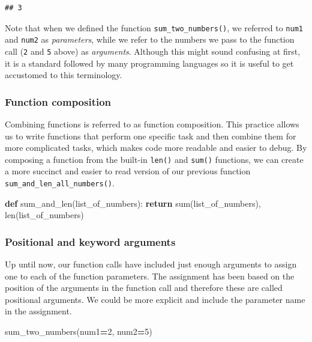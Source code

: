 \documentclass[]{Nemilov}
\newenvironment{Shaded}{\begin{snugshade}}{\end{snugshade}}
\newcommand{\BuiltInTok}[1]{#1}
\newcommand{\ControlFlowTok}[1]{\textcolor[rgb]{0.13,0.29,0.53}{\textbf{#1}}}
\newcommand{\DecValTok}[1]{\textcolor[rgb]{0.00,0.00,0.81}{#1}}
\newcommand{\KeywordTok}[1]{\textcolor[rgb]{0.13,0.29,0.53}{\textbf{#1}}}
\newcommand{\NormalTok}[1]{#1}
\newcommand{\OperatorTok}[1]{\textcolor[rgb]{0.81,0.36,0.00}{\textbf{#1}}}
\begin{document}
\begin{verbatim}
## 3
\end{verbatim}

Note that when we defined the function \texttt{sum\_two\_numbers()}, we referred to
\texttt{num1} and \texttt{num2} as \emph{parameters}, while we refer to the numbers we pass to the
function call (\texttt{2} and \texttt{5} above) as \emph{arguments}. Although this might sound
confusing at first, it is a standard followed by many programming languages so
it is useful to get accustomed to this terminology.

\hypertarget{py-dev-function-composition}{%
\subsubsection{Function composition}\label{py-dev-function-composition}}

Combining functions is referred to as function composition. This practice
allows us to write functions that perform one specific task and then combine
them for more complicated tasks, which makes code more readable and easier to
debug. By composing a function from the built-in \texttt{len()} and \texttt{sum()} functions,
we can create a more succinct and easier to read version of our previous
function \texttt{sum\_and\_len\_all\_numbers()}.

\begin{Shaded}
\begin{Highlighting}[]
\KeywordTok{def}\NormalTok{ sum_and_len(list_of_numbers):}
    \ControlFlowTok{return} \BuiltInTok{sum}\NormalTok{(list_of_numbers), }\BuiltInTok{len}\NormalTok{(list_of_numbers)}
\end{Highlighting}
\end{Shaded}

\hypertarget{py-dev-positional-and-keyword-arguments}{%
\subsubsection{Positional and keyword arguments}\label{py-dev-positional-and-keyword-arguments}}

Up until now, our function calls have included just enough arguments to assign
one to each of the function parameters. The assignment has been based on the
position of the arguments in the function call and therefore these are called
positional arguments. We could be more explicit and include the parameter name
in the assignment.

\begin{Shaded}
\begin{Highlighting}[]
\NormalTok{sum_two_numbers(num1}\OperatorTok{=}\DecValTok{2}\NormalTok{, num2}\OperatorTok{=}\DecValTok{5}\NormalTok{)}
\end{Highlighting}
\end{Shaded}
\end{document}
